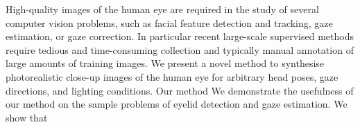 
High-quality images of the human eye are required in the study of several computer vision problems, such as facial feature detection and tracking, gaze estimation, or gaze correction.
In particular recent large-scale supervised methods require tedious and time-consuming collection and typically manual annotation of large amounts of training images.
We present a novel method to synthesise photorealistic close-up images of the human eye for arbitrary head poses, gaze directions, and lighting conditions.
Our method 
We demonstrate the usefulness of our method on the sample problems of eyelid detection and gaze estimation.
We show that 